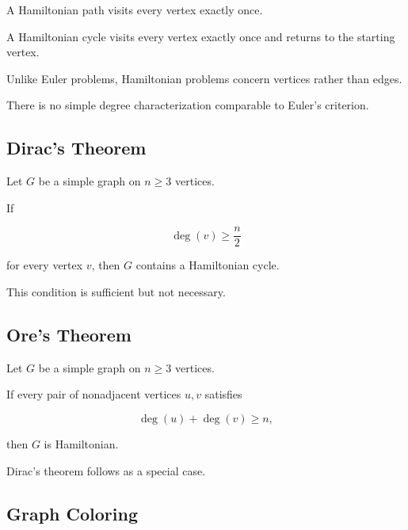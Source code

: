 A Hamiltonian path visits every vertex exactly once.

A Hamiltonian cycle visits every vertex exactly once and returns to the
starting vertex.

Unlike Euler problems, Hamiltonian problems concern vertices rather than
edges.

There is no simple degree characterization comparable to Euler's
criterion.

\subsection{Dirac's Theorem}
\label{subsec:diracs-theorem}

\begin{theorem}
Let \(G\) be a simple graph on \(n\geq3\) vertices.

If

\[
\boxed{
\deg(v)\geq\frac n2
}
\]

for every vertex \(v\), then \(G\) contains a Hamiltonian cycle.
\end{theorem}

This condition is sufficient but not necessary.

\subsection{Ore's Theorem}
\label{subsec:ores-theorem}

\begin{theorem}
Let \(G\) be a simple graph on \(n\geq3\) vertices.

If every pair of nonadjacent vertices \(u,v\) satisfies

\[
\boxed{
\deg(u)+\deg(v)\geq n,
}
\]

then \(G\) is Hamiltonian.
\end{theorem}

Dirac's theorem follows as a special case.

\subsection{Graph Coloring}
\label{subsec:graph-coloring}

